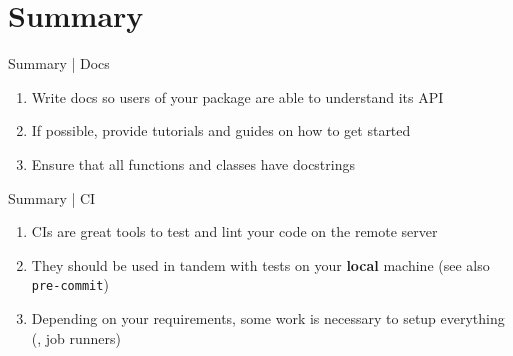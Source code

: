 \section{Summary}

\begin{frame}[fragile]{Summary | Docs}
  \begin{enumerate}
    \item Write docs so users of your package are able to understand its API
    \item If possible, provide tutorials and guides on how to get started
    \item Ensure that all functions and classes have docstrings
  \end{enumerate}
\end{frame}

\begin{frame}[fragile]{Summary | CI}
  \begin{enumerate}
    \item CIs are great tools to test and lint your code on the remote server
    \item They should be used in tandem with tests on your \textbf{local} machine (see also \texttt{pre-commit})
    \item Depending on your requirements, some work is necessary to setup everything (\eg, job runners)
  \end{enumerate}
\end{frame}
